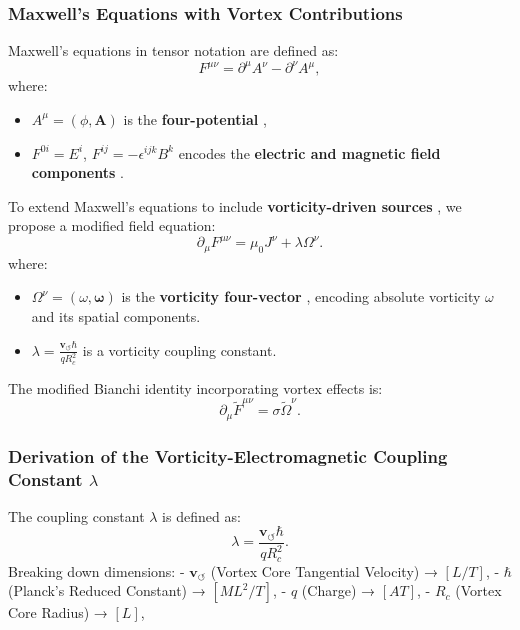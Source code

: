 \documentclass[a4paper,10pt]{article}
\begin{document}
\subsubsection*{Maxwell's Equations with Vortex Contributions}
Maxwell's equations in tensor notation are defined as:
\begin{equation*}
    F^{\mu\nu} = \partial^\mu A^\nu - \partial^\nu A^\mu,
\end{equation*}
where:
\begin{itemize}
    \item \( A^\mu = (\phi, \mathbf{A}) \) is the \textbf{four-potential} ,
    \item \( F^{0i} = E^i \), \( F^{ij} = -\epsilon^{ijk} B^k \) encodes the \textbf{electric and magnetic field components} .
\end{itemize}

To extend Maxwell's equations to include \textbf{vorticity-driven sources} , we propose a modified field equation:
\begin{equation*}
    \partial_\mu F^{\mu\nu} = \mu_0 J^\nu + \lambda \Omega^\nu.
\end{equation*}
where:
\begin{itemize}
    \item \( \Omega^\nu = (\omega, \mathbf{\omega}) \) is the \textbf{vorticity four-vector} , encoding absolute vorticity \( \omega \) and its spatial components.
    \item \( \lambda = \frac{\mathbf{v}_{\scriptscriptstyle\boldsymbol{\circlearrowleft}} \hbar}{q R_c^2} \) is a vorticity coupling constant.
\end{itemize}

The modified Bianchi identity incorporating vortex effects is:
\begin{equation*}
    \partial_\mu \tilde{F}^{\mu\nu} = \sigma \tilde{\Omega}^\nu.
\end{equation*}

\subsubsection*{Derivation of the Vorticity-Electromagnetic Coupling Constant \( \lambda \)}
The coupling constant \( \lambda \) is defined as:
\begin{equation*}
    \lambda = \frac{\mathbf{v}_{\scriptscriptstyle\boldsymbol{\circlearrowleft}} \hbar}{q R_c^2}.
\end{equation*}
Breaking down dimensions:
- \( \mathbf{v}_{\scriptscriptstyle\boldsymbol{\circlearrowleft}} \) (Vortex Core Tangential Velocity) → \( [L/T] \),
- \( \hbar \) (Planck's Reduced Constant) → \( [M L^2 / T] \),
- \( q \) (Charge) → \( [A T] \),
- \( R_c \) (Vortex Core Radius) → \( [L] \),
\end{document}
